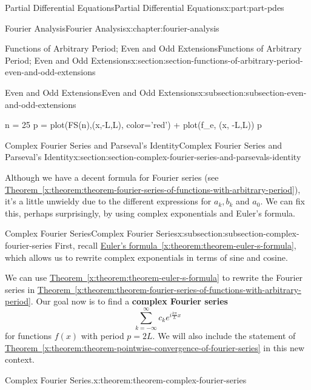 \documentclass[twoside,10pt,]{book}
\newcommand{\xreffont}{\relax}
\newcommand{\terminology}[1]{\textbf{#1}}
\numberwithin{equation}{part}
\begin{document}
\begin{partptx}{Partial Differential Equations}{}{Partial Differential Equations}{}{}{x:part:part-pdes}
\begin{chapterptx}{Fourier Analysis}{}{Fourier Analysis}{}{}{x:chapter:fourier-analysis}
\begin{sectionptx}{Functions of Arbitrary Period; Even and Odd Extensions}{}{Functions of Arbitrary Period; Even and Odd Extensions}{}{}{x:section:section-functions-of-arbitrary-period-even-and-odd-extensions}
\begin{subsectionptx}{Even and Odd Extensions}{}{Even and Odd Extensions}{}{}{x:subsection:subsection-even-and-odd-extensions}
\begin{sageinput}
n = 25
p = plot(FS(n),(x,-L,L), color='red') + plot(f_e, (x, -L,L))
p
\end{sageinput}
\end{subsectionptx}
\end{sectionptx}
%
%
\typeout{************************************************}
\typeout{************************************************}
%
\begin{sectionptx}{Complex Fourier Series and Parseval's Identity}{}{Complex Fourier Series and Parseval's Identity}{}{}{x:section:section-complex-fourier-series-and-parsevals-identity}
\begin{introduction}{}%
Although we have a decent formula for Fourier series (see \hyperref[x:theorem:theorem-fourier-series-of-functions-with-arbitrary-period]{Theorem~{\xreffont\ref{x:theorem:theorem-fourier-series-of-functions-with-arbitrary-period}}}), it's a little unwieldy due to the different expressions for \(a_{k},b_{k}\) and \(a_{0}\). We can fix this, perhaps surprisingly, by using complex exponentials and Euler's formula.%
\end{introduction}%
%
%
\typeout{************************************************}
\typeout{************************************************}
%
\begin{subsectionptx}{Complex Fourier Series}{}{Complex Fourier Series}{}{}{x:subsection:subsection-complex-fourier-series}
First, recall \hyperref[x:theorem:theorem-euler-s-formula]{Euler's formula~{\xreffont\ref{x:theorem:theorem-euler-s-formula}}}, which allows us to rewrite complex exponentials in terms of sine and cosine.%
\par
We can use \hyperref[x:theorem:theorem-euler-s-formula]{Theorem~{\xreffont\ref{x:theorem:theorem-euler-s-formula}}} to rewrite the Fourier series in \hyperref[x:theorem:theorem-fourier-series-of-functions-with-arbitrary-period]{Theorem~{\xreffont\ref{x:theorem:theorem-fourier-series-of-functions-with-arbitrary-period}}}. Our goal now is to find a \terminology{complex Fourier series}%
\begin{equation*}
\sum_{k=-\infty}^{\infty}c_{k}e^{i\frac{k\pi}{L}x}
\end{equation*}
for functions \(f(x)\) with period \(p=2L\). We will also include the statement of \hyperref[x:theorem:theorem-pointwise-convergence-of-fourier-series]{Theorem~{\xreffont\ref{x:theorem:theorem-pointwise-convergence-of-fourier-series}}} in this new context.%
\begin{theorem}{Complex Fourier Series.}{}{x:theorem:theorem-complex-fourier-series}%

\end{theorem}
\end{subsectionptx}
\end{sectionptx}
\end{chapterptx}
\end{partptx}
\end{document}
